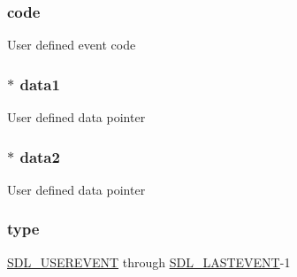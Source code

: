 \subsubsection[{\texorpdfstring{code}{code}}]{ code}\hypertarget{struct_s_d_l___user_event_ad8f8a20f97a86a504de0f82933da62ab}{}\label{struct_s_d_l___user_event_ad8f8a20f97a86a504de0f82933da62ab}
User defined event code 
\subsubsection[{\texorpdfstring{data1}{data1}}]{$\ast$ data1}\hypertarget{struct_s_d_l___user_event_a926be0f9566b1f30625f0dc8a6e43df9}{}\label{struct_s_d_l___user_event_a926be0f9566b1f30625f0dc8a6e43df9}
User defined data pointer 
\subsubsection[{\texorpdfstring{data2}{data2}}]{$\ast$ data2}\hypertarget{struct_s_d_l___user_event_a4e0b4defdbf7d4f26abc76d6c22b5f14}{}\label{struct_s_d_l___user_event_a4e0b4defdbf7d4f26abc76d6c22b5f14}
User defined data pointer 
\subsubsection[{\texorpdfstring{type}{type}}]{ type}\hypertarget{struct_s_d_l___user_event_aa40a9b05c3154032b9f2d7220e9f08dc}{}\label{struct_s_d_l___user_event_aa40a9b05c3154032b9f2d7220e9f08dc}
\hyperlink{_s_d_l__events_8h_a3b589e89be6b35c02e0dd34a55f3fccaa4364c23f54802309e83fdb9b1c07c719}{S\+D\+L\+\_\+\+U\+S\+E\+R\+E\+V\+E\+NT} through \hyperlink{_s_d_l__events_8h_a3b589e89be6b35c02e0dd34a55f3fccaaffeac40a4ff366717c0ebc74118ea2ae}{S\+D\+L\+\_\+\+L\+A\+S\+T\+E\+V\+E\+NT}-\/1 
